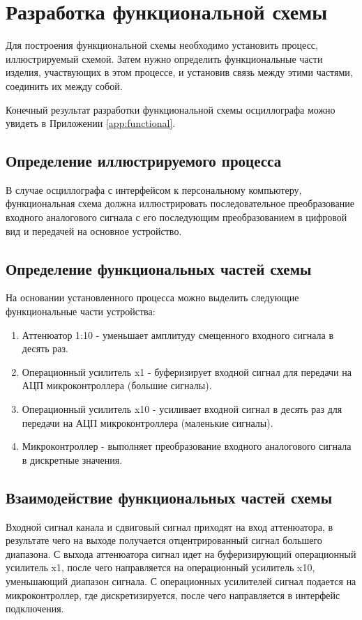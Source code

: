 \section{Разработка функциональной схемы}

Для построения функциональной схемы необходимо установить процесс, иллюстрируемый схемой. Затем нужно определить функциональные части изделия, участвующих в этом процессе, и установив связь между этими частями, соединить их между собой.

Конечный результат разработки функциональной схемы осциллографа можно увидеть в Приложении \ref{app:functional}.

\subsection{Определение иллюстрируемого процесса}

В случае осциллографа с интерфейсом к персональному компьютеру, функциональная схема должна иллюстрировать последовательное преобразование входного аналогового сигнала с его последующим преобразованием в цифровой вид и передачей на основное устройство.

\subsection{Определение функциональных частей схемы}

На основании установленного процесса можно выделить следующие функциональные части устройства:
\begin{enumerate}
    \item Аттенюатор 1:10 - уменьшает амплитуду смещенного входного сигнала в десять раз.
    \item Операционный усилитель x1 - буферизирует входной сигнал для передачи на АЦП микроконтроллера (большие сигналы).
    \item Операционный усилитель x10 - усиливает входной сигнал в десять раз для передачи на АЦП микроконтроллера (маленькие сигналы).
    \item Микроконтроллер - выполняет преобразование входного аналогового сигнала в дискретные значения.
\end{enumerate}

\subsection{Взаимодействие функциональных частей схемы}

Входной сигнал канала и сдвиговый сигнал приходят на вход аттенюатора, в результате чего на выходе получается отцентрированный сигнал большего диапазона.
С выхода аттенюатора сигнал идет на буферизирующий операционный усилитель x1, после чего направляется на операционный усилитель x10, уменьшающий диапазон сигнала.
С операционных усилителей сигнал подается на микроконтроллер, где дискретизируется, после чего направляется в интерфейс подключения.
